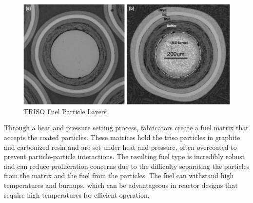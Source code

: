 \begin{figure}[H]
    \centering
    \includegraphics[scale=0.98]{images/triso_review/triso_layers.pdf}
    \caption{TRISO Fuel Particle Layers \cite{particle_review_2019}}
    \label{fig:triso_layers}
\end{figure}

Through a heat and pressure setting process, fabricators create a fuel matrix
that accepts the coated particles. These matrices hold the \gls{triso}
particles in graphite and carbonized resin and are set under heat and pressure,
often overcoated to prevent particle-particle interactions. The resulting fuel
type is incredibly robust and can reduce proliferation concerns due to the
difficulty separating the particles from the matrix and the fuel from the
particles. The fuel can withstand high temperatures and burnups, which can be
advantageous in reactor designs that require high temperatures for efficient
operation.